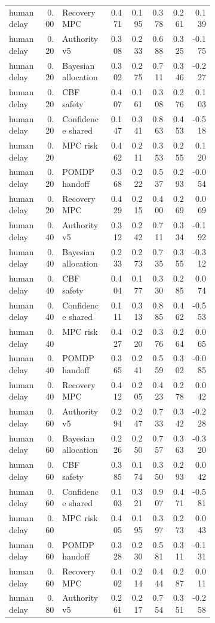 \documentclass{article}
\begin{document}
\begin{center}
\begin{longtable}{p{0.17\linewidth}rp{0.23\linewidth}rrrrr}
human delay & 0.00 & Recovery MPC & 0.471 & 0.195 & 0.378 & 0.261 & 0.139\\
human delay & 0.20 & Authority v5 & 0.308 & 0.233 & 0.688 & 0.325 & -0.175\\
human delay & 0.20 & Bayesian allocation & 0.302 & 0.275 & 0.711 & 0.346 & -0.227\\
human delay & 0.20 & CBF safety & 0.407 & 0.161 & 0.308 & 0.276 & 0.103\\
human delay & 0.20 & Confidence shared & 0.147 & 0.341 & 0.863 & 0.453 & -0.518\\
human delay & 0.20 & MPC risk & 0.462 & 0.211 & 0.353 & 0.255 & 0.120\\
human delay & 0.20 & POMDP handoff & 0.368 & 0.222 & 0.537 & 0.293 & -0.054\\
human delay & 0.20 & Recovery MPC & 0.429 & 0.215 & 0.400 & 0.269 & 0.069\\
human delay & 0.40 & Authority v5 & 0.312 & 0.242 & 0.711 & 0.334 & -0.192\\
human delay & 0.40 & Bayesian allocation & 0.233 & 0.273 & 0.735 & 0.355 & -0.312\\
human delay & 0.40 & CBF safety & 0.404 & 0.177 & 0.330 & 0.285 & 0.074\\
human delay & 0.40 & Confidence shared & 0.111 & 0.313 & 0.885 & 0.462 & -0.553\\
human delay & 0.40 & MPC risk & 0.427 & 0.220 & 0.376 & 0.264 & 0.065\\
human delay & 0.40 & POMDP handoff & 0.365 & 0.241 & 0.559 & 0.302 & -0.085\\
human delay & 0.40 & Recovery MPC & 0.412 & 0.205 & 0.423 & 0.278 & 0.042\\
human delay & 0.60 & Authority v5 & 0.294 & 0.247 & 0.733 & 0.342 & -0.228\\
human delay & 0.60 & Bayesian allocation & 0.226 & 0.250 & 0.757 & 0.363 & -0.320\\
human delay & 0.60 & CBF safety & 0.385 & 0.174 & 0.350 & 0.293 & 0.042\\
human delay & 0.60 & Confidence shared & 0.103 & 0.321 & 0.907 & 0.471 & -0.581\\
human delay & 0.60 & MPC risk & 0.405 & 0.195 & 0.397 & 0.273 & 0.043\\
human delay & 0.60 & POMDP handoff & 0.328 & 0.230 & 0.581 & 0.311 & -0.131\\
human delay & 0.60 & Recovery MPC & 0.402 & 0.214 & 0.444 & 0.287 & 0.011\\
human delay & 0.80 & Authority v5 & 0.261 & 0.217 & 0.754 & 0.351 & -0.258\\

\end{longtable}
\end{center}
\end{document}
